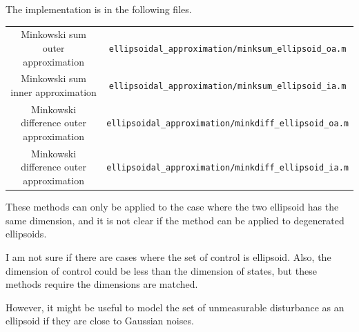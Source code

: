 \documentclass{article}
\begin{document}
The implementation is in the following files.
\begin{table}[h!]
	\centering
	\begin{tabular}{|c|c|}
		\hline
		Minkowski sum outer approximation& \texttt{ellipsoidal\_approximation/minksum\_ellipsoid\_oa.m} \\
		Minkowski sum inner approximation& \texttt{ellipsoidal\_approximation/minksum\_ellipsoid\_ia.m} \\
		Minkowski difference outer approximation& \texttt{ellipsoidal\_approximation/minkdiff\_ellipsoid\_oa.m} \\
		Minkowski difference outer approximation& \texttt{ellipsoidal\_approximation/minkdiff\_ellipsoid\_ia.m} \\
		\hline
	\end{tabular}
	\label{minksum_diff_ellipsoids}
\end{table}

These methods can only be applied to the case where the two ellipsoid has the same dimension, and it is not clear if the method can be applied to degenerated ellipsoids.

I am not sure if there are cases where the set of control is ellipsoid. Also, the dimension of control could be less than the dimension of states, but these methods require the dimensions are matched.

However, it might be useful to model the set of unmeasurable disturbance as an ellipsoid if they are close to Gaussian noises.


\end{document}
